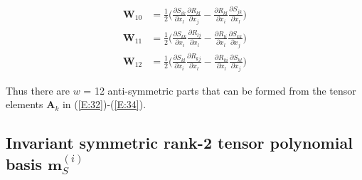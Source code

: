 \begin{subequations}
\begin{align}
	\mathbf{W}_{10}  &= \frac{1}{2} 
			  \bigg( \frac{\partial S_{ik}}{\partial x_l}
					 \frac{\partial R_{kl}}{\partial x_j} 
				  	- 
					 \frac{\partial R_{kl}}{\partial x_i} 
					 \frac{\partial S_{jk}}{\partial x_l} \bigg)  \\	
	\mathbf{W}_{11}  &= \frac{1}{2} 
			  \bigg( \frac{\partial S_{kk}}{\partial x_i}
					 \frac{\partial R_{lj}}{\partial x_l} 
				  	- 
					 \frac{\partial R_{li}}{\partial x_l} 
					 \frac{\partial S_{kk}}{\partial x_j} \bigg)  \\
	\mathbf{W}_{12}  &= \frac{1}{2} 
			  \bigg( \frac{\partial S_{kl}}{\partial x_i}
					 \frac{\partial R_{kj}}{\partial x_l} 
				  	- 
					 \frac{\partial R_{ki}}{\partial x_l} 
					 \frac{\partial S_{kl}}{\partial x_j} \bigg)				 
\end{align}
\end{subequations}
%
%    

Thus there are $w$ = 12 anti-symmetric parts that can be formed from the tensor elements $\mathbf{A}_k$ in (\ref{E:32})-(\ref{E:34}).  

\subsection{Invariant symmetric rank-2 tensor polynomial basis $\mathbf{m}^{(i)}_S$}
\label{sec:2E}


